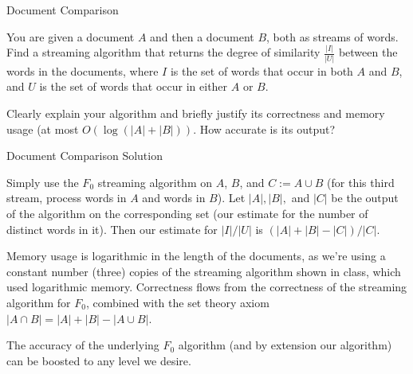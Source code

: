 \documentclass[10pt]{beamer}
\begin{document}
\begin{frame}{Document Comparison}

You are given a document $A$ and then a document $B$, both as streams of words.
Find a streaming algorithm that returns the degree of similarity $\frac{|I|}{|U|}$ between
the words in the documents, where $I$ is the set of words that occur in both $A$ and $B$,
and $U$ is the set of words that occur in either $A$ or $B$.

Clearly explain your algorithm and briefly justify its correctness and memory usage
(at most $O(\log (|A| + |B|))$. How accurate is its output?

\end{frame}

\begin{frame}{Document Comparison {\color{gray} Solution}}

{\color{blue}
Simply use the $F_0$ streaming algorithm on $A$, $B$, and $C := A \cup B$
(for this third stream, process words in $A$ and words in $B$). Let $|A|, |B|,$ and $|C|$
be the output of the algorithm on the corresponding set (our estimate for the number
of distinct words in it). Then our estimate for $|I| / |U|$ is $(|A| + |B| - |C|) / |C|$.

Memory usage is logarithmic in the length of the documents, as we're using a constant
number (three) copies of the streaming algorithm shown in class, which used logarithmic
memory. Correctness flows from the correctness of the streaming algorithm for $F_0$,
combined with the set theory axiom $|A \cap B| = |A| + |B| - |A \cup B|$.

The accuracy of the underlying $F_0$ algorithm (and by extension our algorithm)
can be boosted to any level we desire.
}

\end{frame}
\end{document}
